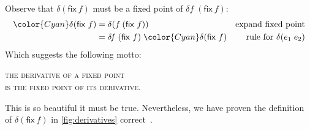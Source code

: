\documentclass[sigplan,screen,review,timestamp,dvipsnames]{acmart}
\newcommand{\hilited}{\color{Cyan}}
\renewcommand{\d}{\delta}
\newcommand{\kw}[1]{\textsf{#1}}
\newcommand{\efix}{\kw{fix}~}
\begin{document}
\vspace{1em}

Observe that $\d(\efix f)$ must be a fixed point of $\d\!f\;(\efix f)$:
%
\begin{align*}
  {\hilited \d(\efix f)}
  &= \d(f\: (\efix f))
  & \text{expand fixed point}\\
  &= \d\!f\; (\efix f)\; {\hilited \d(\efix f)}
  & \text{rule for}~\delta(e_1\;e_2)
\end{align*}
%
Which suggests the following motto:
\begin{center}
  \large \scshape
  the derivative of a fixed point\\
  is the fixed point of its derivative.
\end{center}
%
This is so beautiful it must be true. Nevertheless, we have proven the definition of $\delta(\efix f)$ in \cref{fig:derivatives} correct~\citep{fixderiv}.





\end{document}
